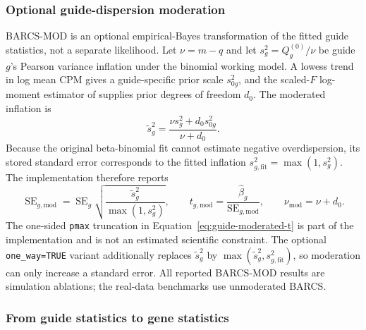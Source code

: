 \subsubsection{Optional guide-dispersion moderation}

BARCS-MOD is an optional empirical-Bayes transformation of the fitted guide
statistics, not a separate likelihood.  Let $\nu=m-q$ and let
$s_g^2=Q_g^{(0)}/\nu$ be guide $g$'s Pearson variance inflation under the
binomial working model.  A lowess trend in log mean CPM gives a guide-specific
prior scale $s_{0g}^2$, and the scaled-$F$ log-moment estimator of
\citet{smyth2004linear} supplies prior degrees of freedom $d_0$.  The moderated
inflation is
\begin{equation}
  \widetilde{s}_g^2
  =
  \frac{\nu s_g^2+d_0s_{0g}^2}{\nu+d_0}.
  \label{eq:guide-moderation}
\end{equation}
Because the original beta-binomial fit cannot estimate negative
overdispersion, its stored standard error corresponds to the fitted inflation
$s_{g,\mathrm{fit}}^2=\max(1,s_g^2)$.  The implementation therefore reports
\begin{equation}
  \operatorname{SE}_{g,\mathrm{mod}}
  =
  \operatorname{SE}_{g}
  \sqrt{\frac{\widetilde{s}_g^2}{\max(1,s_g^2)}},
  \qquad
  t_{g,\mathrm{mod}}
  =
  \frac{\widehat\beta_g}{\operatorname{SE}_{g,\mathrm{mod}}},
  \qquad
  \nu_{\mathrm{mod}}=\nu+d_0 .
  \label{eq:guide-moderated-t}
\end{equation}
The one-sided \texttt{pmax} truncation in
Equation~\eqref{eq:guide-moderated-t} is part of the implementation and is not
an estimated scientific constraint.  The optional \texttt{one\_way=TRUE}
variant additionally replaces $\widetilde{s}_g^2$ by
$\max(\widetilde{s}_g^2,s_{g,\mathrm{fit}}^2)$, so moderation can only increase
a standard error.  All reported BARCS-MOD results are simulation ablations;
the real-data benchmarks use unmoderated BARCS.

\subsubsection{From guide statistics to gene statistics}

